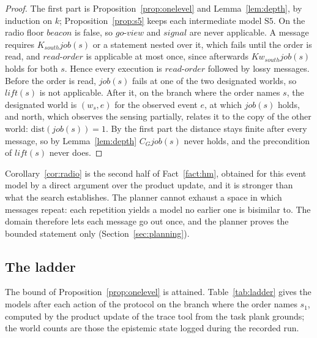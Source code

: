 \documentclass[11pt,a4paper]{article}
\theoremstyle{definition}
\newcommand{\Kop}[1]{K_{#1}}
\newcommand{\Cop}[1]{C_{#1}}
\newcommand{\Kw}[1]{\mathit{Kw}_{#1}}
\newcommand{\ag}[1]{\mathit{#1}}
\newcommand{\job}{\mathit{job}}
\newcommand{\dist}{\mathrm{dist}}
\begin{document}
\begin{proof}
The first part is Proposition~\ref{prop:onelevel} and
Lemma~\ref{lem:depth}, by induction on $k$; Proposition~\ref{prop:s5} keeps
each intermediate model $\mathrm{S5}$. On the radio floor $\mathit{beacon}$ is
false, so $\mathit{go\text{-}view}$ and $\mathit{signal}$ are never applicable.
A message requires $\Kop{\ag{south}}\job(s)$ or a statement nested over it, which
fails until the order is read, and $\mathit{read\text{-}order}$ is applicable at
most once, since afterwards $\Kw{\ag{south}}\job(s)$ holds for both $s$. Hence
every execution is $\mathit{read\text{-}order}$ followed by lossy messages.
Before the order is read, $\job(s)$ fails at one of the two designated worlds,
so $\mathit{lift}(s)$ is not applicable. After it, on the branch where the order
names $s$, the designated world is $(w_s, e)$ for the observed event $e$, at
which $\job(s)$ holds, and north, which observes the sensing partially, relates
it to the copy of the other world: $\dist(\job(s)) = 1$. By the first part the
distance stays finite after every message, so by Lemma~\ref{lem:depth}
$\Cop{G}\job(s)$ never holds, and the precondition of $\mathit{lift}(s)$ never
does.
\end{proof}

\noindent
Corollary~\ref{cor:radio} is the second half of Fact~\ref{fact:hm}, obtained
for this event model by a direct argument over the product update, and it is
stronger than what the search establishes. The planner cannot exhaust a space in
which messages repeat: each repetition yields a model no earlier one is
bisimilar to. The domain therefore lets each message go out once, and the
planner proves the bounded statement only (Section~\ref{sec:planning}).

\subsection{The ladder}

The bound of Proposition~\ref{prop:onelevel} is attained. Table~\ref{tab:ladder}
gives the models after each action of the protocol on the branch where the
order names $s_1$, computed by the product update of the trace tool from the
task plank grounds; the world counts are those the epistemic state logged during
the recorded run.
\end{document}

